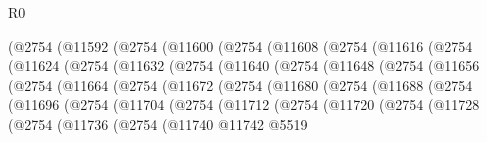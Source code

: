 \begin{lexlean}{R0}
\begin{coremodule}
              (@2754
                (@11592
                  (@2754
                    (@11600
                      (@2754
                        (@11608
                          (@2754
                            (@11616
                              (@2754
                                (@11624
                                  (@2754
                                    (@11632
                                      (@2754
                                        (@11640
                                          (@2754
                                            (@11648
                                              (@2754
                                                (@11656
                                                  (@2754
                                                    (@11664
                                                      (@2754
                                                        (@11672
                                                          (@2754
                                                            (@11680
                                                              (@2754
                                                                (@11688
                                                                  (@2754
                                                                    (@11696
                                                                      (@2754
                                                                        (@11704
                                                                          (@2754
                                                                            (@11712
                                                                              (@2754
                                                                                (@11720
                                                                                  (@2754
                                                                                    (@11728
                                                                                      (@2754
                                                                                        (@11736
                                                                                          (@2754
                                                                                            (@11740
                                                                                              @11742
                                                                                              @5519

\end{coremodule}
\end{lexlean}
